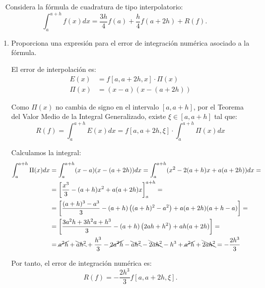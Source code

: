 \begin{ejercicio}~\label{ej:2.3.9}
    Considera la fórmula de cuadratura de tipo interpolatorio:
    \begin{equation*}
        \int_{a}^{a+h} f(x)dx = \frac{3h}{4}f(a) + \frac{h}{4}f(a + 2h) + R(f).
    \end{equation*}
    \begin{enumerate}
        \item Proporciona una expresión para el error de integración numérica asociado a la fórmula.
        
        El error de interpolación es:
        \begin{align*}
            E(x) &= f[a, a + 2h, x]\cdot \Pi(x)\\
            \Pi(x) &= (x - a)(x - (a + 2h))
        \end{align*}

        Como $\Pi(x)$ no cambia de signo en el intervalo $[a, a + h]$, por el Teorema del Valor Medio de la Integral Generalizado, existe $\xi\in [a, a + h]$ tal que:
        \begin{equation*}
            R(f) = \int_{a}^{a+h} E(x)dx = f[a, a + 2h, \xi]\cdot \int_{a}^{a+h} \Pi(x)dx
        \end{equation*}

        Calculamos la integral:
        \begin{align*}
            \int_{a}^{a+h} \Pi(x)dx &= \int_{a}^{a+h} (x - a)(x - (a + 2h))dx
            = \int_{a}^{a+h} (x^2 -2(a + h)x + a(a + 2h))dx =\\
            &= \left[\dfrac{x^3}{3} - (a + h)x^2 + a(a + 2h)x\right]_{a}^{a+h}
            =\\&= \left[\dfrac{(a + h)^3 - a^3}{3} - (a + h)\left((a + h)^2 - a^2\right) + a(a + 2h)(a + h - a)\right]
            =\\&= \left[\dfrac{3a^2h + 3h^2a + h^3}{3} - (a + h)\left(2ah + h^2\right) + ah(a + 2h)\right]
            =\\&= \cancel{a^2h} + \bcancel{ah^2} + \dfrac{h^3}{3} - \cancel{2a^2h} - \bcancel{ah^2} -\bcancel{2ah^2} - h^3 + \cancel{a^2h}+ \bcancel{2ah^2}
            = -\dfrac{2h^3}{3}
        \end{align*}

        Por tanto, el error de integración numérica es:
        \begin{equation*}
            R(f) = -\dfrac{2h^3}{3}f[a, a + 2h, \xi].
        \end{equation*}


\end{enumerate}
\end{ejercicio}
